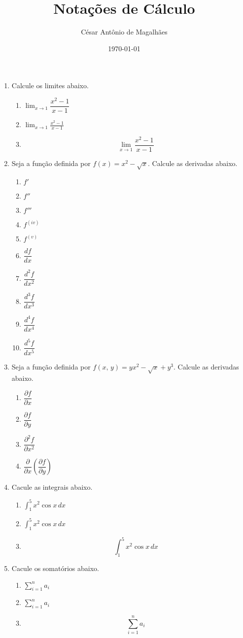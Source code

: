 \documentclass[12pt,a4paper]{article}
\title{Notações de Cálculo}
\author{César Antônio de Magalhães}
\date{\today}
\newcommand{\limite}{\displaystyle\lim}
\newcommand{\integral}{\displaystyle\int}
\newcommand{\somatorio}{\displaystyle\sum}
\begin{document}
	\begin{enumerate}
		\item Calcule os limites abaixo.
		\begin{enumerate}
			\item $\displaystyle \lim_{x \to 1} \dfrac{x^2 - 1}{x- 1}$
			\item $\limite_{x \to 1} \frac{x^2 - 1}{x- 1}$
			\item $$\lim_{x \to 1} \dfrac{x^2 - 1}{x- 1}$$
		\end{enumerate}
		\item Seja a função definida por $f(x) = x^2 - \sqrt{x}$. Calcule as derivadas abaixo.
		\begin{enumerate}
			\item $f'$
			\item $f''$
			\item $f'''$
			\item $f^{(iv)}$
			\item $f^{(v)}$
			\item $\dfrac{df}{dx}$
			\item $\dfrac{d^2f}{dx^2}$
			\item $\dfrac{d^3f}{dx^3}$
			\item $\dfrac{d^4f}{dx^4}$
			\item $\dfrac{d^5f}{dx^5}$
		\end{enumerate}
		\item Seja a função definida por $f(x,\,y) = yx^2 - \sqrt{x} + y^3$. Calcule as derivadas abaixo.
		\begin{enumerate}
			\item $\dfrac{\partial f}{\partial x}$
			\item $\dfrac{\partial f}{\partial y}$
			\item $\dfrac{\partial^2f}{\partial x^2}$
			\item $\dfrac{\partial}{\partial x} \left(\dfrac{\partial f}{\partial y}\right)$
		\end{enumerate}
		\item Cacule as integrais abaixo.
		\begin{enumerate}
			\item $\displaystyle\int_1^5 x^2\cos x\, dx$
			\item $\integral_1^5 x^2\cos x\, dx$
			\item $$\int_1^5 x^2\cos x\, dx$$
		\end{enumerate}
		\item Cacule os somatórios abaixo.
		\begin{enumerate}
			\item $\displaystyle\sum_{i=1}^n a_i$
			\item $\somatorio_{i=1}^n a_i$
			\item $$\sum_{i=1}^n a_i$$
		\end{enumerate}
	\end{enumerate}		
\end{document}
